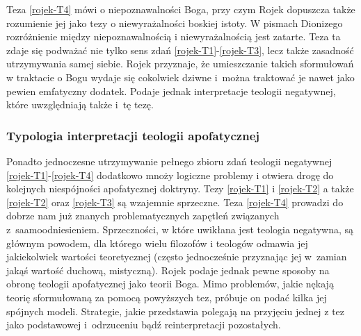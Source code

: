 Teza \eqref{rojek-T4} mówi o niepoznawalności Boga, przy czym Rojek dopuszcza także rozumienie jej jako tezy o niewyrażalności boskiej istoty. W pismach Dionizego rozróżnienie między niepoznawalnością i niewyrażalnością jest zatarte. Teza ta zdaje się podważać nie tylko sens zdań \eqref{rojek-T1}-\eqref{rojek-T3}, lecz także zasadność utrzymywania samej siebie.
Rojek przyznaje, że umieszczanie
takich sformułowań w traktacie o Bogu wydaje się cokolwiek dziwne i~można traktować je nawet jako pewien emfatyczny dodatek. Podaje jednak
interpretacje teologii negatywnej, które uwzględniają także i~tę tezę.




\subsubsection{Typologia interpretacji teologii apofatycznej}








Ponadto jednoczesne utrzymywanie pełnego zbioru zdań teologii negatywnej \eqref{rojek-T1}-\eqref{rojek-T4}
dodatkowo mnoży logiczne problemy i otwiera drogę do kolejnych niespójności
apofatycznej doktryny.
Tezy \eqref{rojek-T1} i \eqref{rojek-T2} a także \eqref{rojek-T2} oraz \eqref{rojek-T3} są
wzajemnie sprzeczne. Teza \eqref{rojek-T4} prowadzi do dobrze nam już znanych problematycznych
zapętleń związanych z~saamoodniesieniem. Sprzeczności, w które uwikłana jest teologia
negatywna, są głównym powodem, dla którego wielu filozofów i teologów
odmawia jej jakiekolwiek wartości teoretycznej (często jednocześnie przyznając jej w~zamian
jakąś wartość duchową, mistyczną). 
Rojek podaje jednak pewne sposoby na obronę teologii apofatycznej jako teorii Boga.
Mimo problemów, jakie nękają teorię sformułowaną za pomocą powyższych
tez, próbuje on podać kilka jej spójnych modeli. Strategie, jakie
przedstawia polegają na przyjęciu jednej z tez jako podstawowej
i~odrzuceniu bądź reinterpretacji pozostałych.



